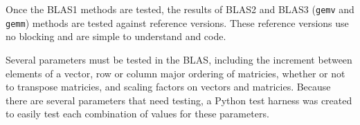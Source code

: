   Once the BLAS1 methods are tested, the results of BLAS2 and BLAS3 (\texttt{gemv} and \texttt{gemm}) methods are tested against reference versions. These reference versions use no blocking and are simple to understand and code.

  Several parameters must be tested in the BLAS, including the increment between elements of a vector, row or column major ordering of matricies, whether or not to transpose matricies, and scaling factors on vectors and matricies. Because there are several parameters that need testing, a Python test harness was created to easily test each combination of values for these parameters.
